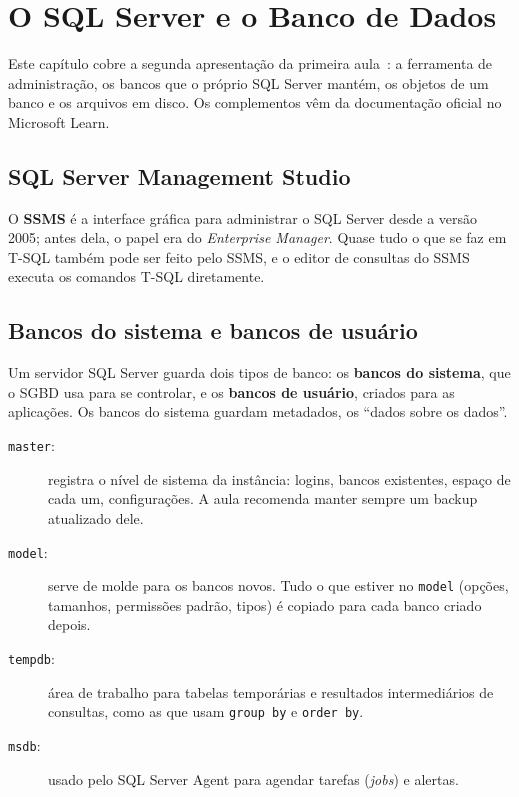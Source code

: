 \setchapterpreamble[u]{\margintoc}
\chapter{O SQL Server e o Banco de Dados}

Este capítulo cobre a segunda apresentação da primeira
aula~\cite{BaiocoCET615}: a ferramenta de administração, os bancos que o
próprio SQL Server mantém, os objetos de um banco e os arquivos em disco.
Os complementos vêm da documentação oficial no Microsoft Learn.

\section{SQL Server Management Studio}

O \textbf{SSMS} é a interface gráfica para administrar o SQL
Server desde a versão 2005; antes dela, o papel era do \emph{Enterprise
Manager}. Quase tudo o que se faz em T-SQL também pode ser feito pelo SSMS,
e o editor de consultas do SSMS executa os comandos T-SQL diretamente.

\section{Bancos do sistema e bancos de usuário}

Um servidor SQL Server guarda dois tipos de banco: os \textbf{bancos do
sistema}, que o SGBD usa para se controlar, e os \textbf{bancos de
usuário}, criados para as aplicações. Os bancos do sistema guardam
metadados, os ``dados sobre os dados''.

\begin{description}
	\item[\texttt{master}:] registra o nível de
	sistema da instância: logins, bancos existentes, espaço de cada um,
	configurações. A aula recomenda manter sempre um backup atualizado dele.
	\item[\texttt{model}:] serve de molde para os bancos novos. Tudo o que
	estiver no \texttt{model} (opções, tamanhos, permissões padrão, tipos)
	é copiado para cada banco criado depois.
	\item[\texttt{tempdb}:] área de trabalho para tabelas temporárias e
	resultados intermediários de consultas, como as que usam
	\texttt{group by} e \texttt{order by}.
	\item[\texttt{msdb}:] usado pelo SQL Server Agent para agendar tarefas
	(\emph{jobs}) e alertas.
\end{description}

